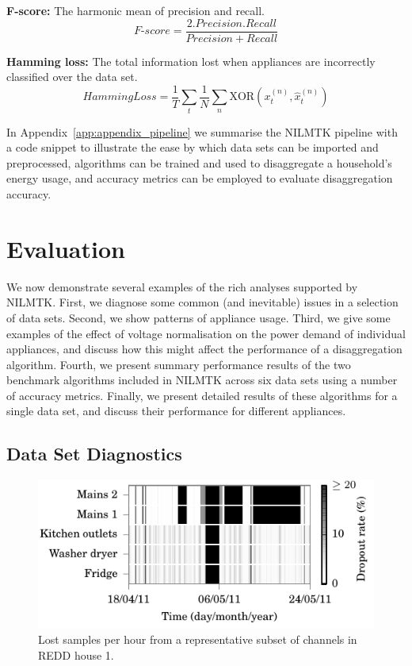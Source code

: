 \documentclass{sig-alternate}
\newcommand{\appref}[1]{Appendix~\ref{#1}}
\begin{document}
\textbf{F-score:} The harmonic mean of precision and recall.
\begin{equation}
\mathit{F\text{-}score} = \frac
            {2 . \mathit{Precision} . \mathit{Recall}}
            {\mathit{Precision} + \mathit{Recall}}
\end{equation}

\textbf{Hamming loss:} The total information lost when appliances are incorrectly classified over the data set.
\begin{equation}
\mathit{HammingLoss} = 
        \frac{1}{T} \sum_{t}
        \frac{1}{N} \sum_{n}
        \mathrm{XOR} \left ( x^{(n)}_t, \hat{x}^{(n)}_t \right )
\end{equation}

In \appref{app:appendix_pipeline} we summarise the NILMTK pipeline with a code snippet to illustrate the ease by which data sets can be imported and preprocessed, algorithms can be trained and used to disaggregate a household's energy usage, and accuracy metrics can be employed to evaluate disaggregation accuracy.

\section{Evaluation}
\label{evaluation}

\noindent
We now demonstrate several examples of the rich analyses supported by NILMTK. First, we diagnose some common (and inevitable) issues in a selection of data sets.  Second, we show patterns of appliance usage. Third, we give some examples of the effect of voltage normalisation on the power demand of individual appliances, and discuss how this might affect the performance of a disaggregation algorithm. Fourth, we present summary performance results of the two benchmark algorithms included in NILMTK across six data sets using a number of accuracy metrics. Finally, we present detailed results of these algorithms for a single data set, and discuss their performance for different appliances.

\subsection{Data Set Diagnostics}

\begin{figure}[!t]
  \centering
  \includegraphics[width=\columnwidth]{figures/lost_samples.pdf} 
  \caption{Lost samples per hour from a representative subset of channels in REDD house 1.}
  \label{fig:lost_samples} 
\end{figure}
\end{document}
